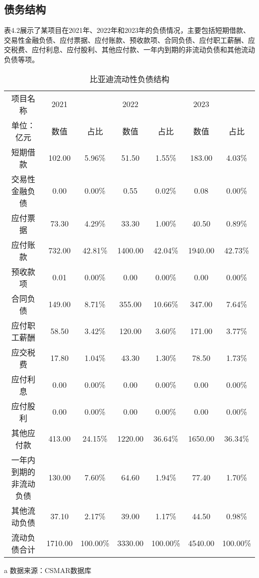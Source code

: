 \subsection{债务结构}
表4.2展示了某项目在2021年、2022年和2023年的负债情况，主要包括短期借款、交易性金融负债、应付票据、应付账款、预收款项、合同负债、应付职工薪酬、应交税费、应付利息、应付股利、其他应付款、一年内到期的非流动负债和其他流动负债等项。
\begin{table}
  \centering
  \begin{threeparttable}[c]
    \caption{比亚迪流动性负债结构}
    \label{tab:current-liabilities}
    \begin{tabular}{ccccccc}
      \toprule
      项目名称 & 2021 & ~ & 2022 & ~ & 2023 & ~ \\ 
        单位：亿元 & 数值 & 占比 & 数值 & 占比 & 数值 & 占比 \\ 
      \midrule
        短期借款 & 102.00  & 5.96\% & 51.50  & 1.55\% & 183.00  & 4.03\% \\ 
        交易性金融负债 & 0.00  & 0.00\% & 0.55  & 0.02\% & 0.08  & 0.00\% \\ 
        应付票据 & 73.30  & 4.29\% & 33.30  & 1.00\% & 40.50  & 0.89\% \\ 
        应付账款 & 732.00  & 42.81\% & 1400.00  & 42.04\% & 1940.00  & 42.73\% \\ 
        预收款项 & 0.01  & 0.00\% & 0.00  & 0.00\% & 0.00  & 0.00\% \\ 
        合同负债 & 149.00  & 8.71\% & 355.00  & 10.66\% & 347.00  & 7.64\% \\ 
        应付职工薪酬 & 58.50  & 3.42\% & 120.00  & 3.60\% & 171.00  & 3.77\% \\ 
        应交税费 & 17.80  & 1.04\% & 43.30  & 1.30\% & 78.50  & 1.73\% \\ 
        应付利息 & 0.00  & 0.00\% & 0.00  & 0.00\% & 0.00  & 0.00\% \\ 
        应付股利 & 0.00  & 0.00\% & 0.00  & 0.00\% & 0.00  & 0.00\% \\ 
        其他应付款 & 413.00  & 24.15\% & 1220.00  & 36.64\% & 1650.00  & 36.34\% \\ 
        一年内到期的非流动负债 & 130.00  & 7.60\% & 64.60  & 1.94\% & 77.40  & 1.70\% \\ 
        其他流动负债 & 37.10  & 2.17\% & 39.00  & 1.17\% & 44.50  & 0.98\% \\ 
        流动负债合计 & 1710.00  & 100.00\% & 3330.00  & 100.00\% & 4540.00  & 100.00\% \\ 
      \bottomrule
    \end{tabular}
    \begin{tablenotes}
      \item [a] 数据来源：CSMAR数据库
    \end{tablenotes}
  \end{threeparttable}
\end{table}

